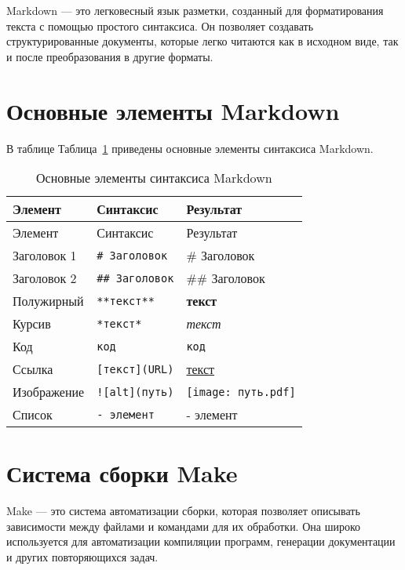\documentclass[
  12pt,
  a4paper,
  DIV=11,
  numbers=noendperiod]{scrreprt}
\begin{document}
Markdown --- это легковесный язык разметки, созданный для форматирования
текста с помощью простого синтаксиса. Он позволяет создавать
структурированные документы, которые легко читаются как в исходном виде,
так и после преобразования в другие форматы.

\section{Основные элементы
Markdown}\label{ux43eux441ux43dux43eux432ux43dux44bux435-ux44dux43bux435ux43cux435ux43dux442ux44b-markdown}

В таблице Таблица~\ref{tbl-markdown} приведены основные элементы
синтаксиса Markdown.

\begin{longtable}[]{@{}lll@{}}
\caption{Основные элементы синтаксиса
Markdown}\label{tbl-markdown}\tabularnewline
\toprule\noalign{}
Элемент & Синтаксис & Результат \\
\midrule\noalign{}
\endfirsthead
\toprule\noalign{}
Элемент & Синтаксис & Результат \\
\midrule\noalign{}
\endhead
\bottomrule\noalign{}
\endlastfoot
Заголовок 1 & \texttt{\#\ Заголовок} & \# Заголовок \\
Заголовок 2 & \texttt{\#\#\ Заголовок} & \#\# Заголовок \\
Полужирный & \texttt{**текст**} & \textbf{текст} \\
Курсив & \texttt{*текст*} & \emph{текст} \\
Код & \texttt{\textasciigrave{}код\textasciigrave{}} & \texttt{код} \\
Ссылка & \texttt{{[}текст{]}(URL)} & \href{URL}{текст} \\
Изображение & \texttt{!{[}alt{]}(путь)} & \texttt{[image: путь.pdf]} \\
Список & \texttt{-\ элемент} & - элемент \\
\end{longtable}

\section{Система сборки
Make}\label{ux441ux438ux441ux442ux435ux43cux430-ux441ux431ux43eux440ux43aux438-make}

Make --- это система автоматизации сборки, которая позволяет описывать
зависимости между файлами и командами для их обработки. Она широко
используется для автоматизации компиляции программ, генерации
документации и других повторяющихся задач.
\end{document}
